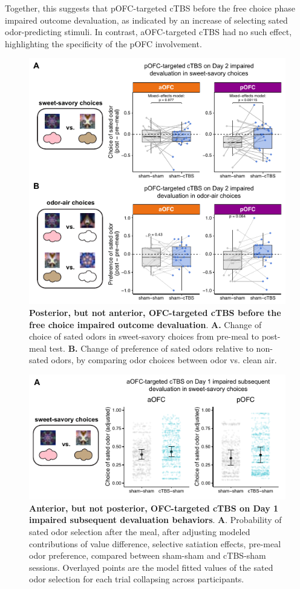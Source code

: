 \documentclass[lineno,sn-basic]{sn-jnl}%
\begin{document}
Together, this suggests that pOFC-targeted cTBS before the free choice phase impaired outcome devaluation, as indicated by an increase of selecting sated odor-predicting stimuli. In contrast, aOFC-targeted cTBS had no such effect, highlighting the specificity of the pOFC involvement. 


\begin{figure}
\centering
\includegraphics[width=0.85\linewidth]{fig_day2.pdf}
\caption{\textbf{Posterior, but not anterior, OFC-targeted cTBS before the free choice  impaired outcome devaluation}. 
\textbf{A.} Change of choice of sated odors in sweet-savory choices from pre-meal to post-meal test. 
\textbf{B.} Change of preference of sated odors relative to non-sated odors, by comparing odor choices between odor vs. clean air. }
\label{fig_day2}
\end{figure}


\begin{figure}
\centering
\includegraphics[width=0.85\linewidth]{fig_day1.pdf}
\caption{\textbf{Anterior, but not posterior, OFC-targeted cTBS on Day 1 impaired subsequent devaluation behaviors}.
\textbf{A}. Probability of sated odor selection after the meal, after adjusting modeled contributions of value difference, selective satiation effects, pre-meal odor preference, compared between sham-sham and cTBS-sham sessions. Overlayed points are the model fitted values of the sated odor selection for each trial collapsing across participants. 
}
\label{fig-day1}
\end{figure}
\end{document}
